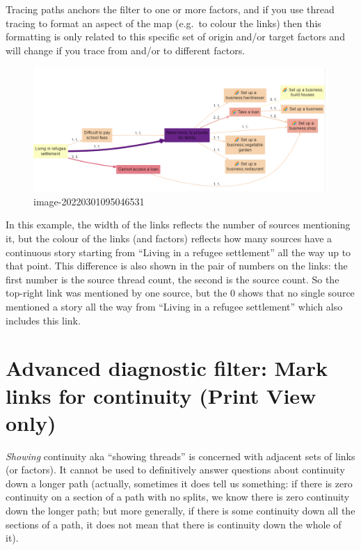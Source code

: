 \documentclass[
]{book}
\begin{document}
Tracing paths anchors the filter to one or more factors, and if you use thread tracing to format an aspect of the map (e.g.~to colour the links) then this formatting is only related to this specific set of origin and/or target factors and will change if you trace from and/or to different factors.

\begin{figure}
\centering
\includegraphics{_assets/image-20220301095046531.png}
\caption{image-20220301095046531}
\end{figure}

In this example, the width of the links reflects the number of sources mentioning it, but the colour of the links (and factors) reflects how many sources have a continuous story starting from ``Living in a refugee settlement'' all the way up to that point. This difference is also shown in the pair of numbers on the links: the first number is the source thread count, the second is the source count. So the top-right link was mentioned by one source, but the 0 shows that no single source mentioned a story all the way from ``Living in a refugee settlement'' which also includes this link.

\hypertarget{advanced-diagnostic-filter-mark-links-for-continuity-print-view-only}{%
\section{Advanced diagnostic filter: Mark links for continuity (Print View only)}\label{advanced-diagnostic-filter-mark-links-for-continuity-print-view-only}}

\emph{Showing} continuity aka ``showing threads'' is concerned with adjacent sets of links (or factors). It cannot be used to definitively answer questions about continuity down a longer path (actually, sometimes it does tell us something: if there is zero continuity on a section of a path with no splits, we know there is zero continuity down the longer path; but more generally, if there is some continuity down all the sections of a path, it does not mean that there is continuity down the whole of it).
\end{document}

